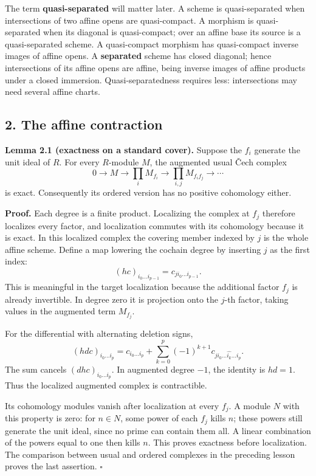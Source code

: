 \documentclass[11pt]{article}
\begin{document}
The term \textbf{quasi-separated} will matter later. A scheme is
quasi-separated when intersections of two affine opens are
quasi-compact. A morphism is quasi-separated when its diagonal is
quasi-compact; over an affine base its source is a quasi-separated
scheme. A quasi-compact morphism has quasi-compact inverse images of
affine opens. A \textbf{separated} scheme has closed diagonal; hence
intersections of its affine opens are affine, being inverse images of
affine products under a closed immersion. Quasi-separatedness requires
less: intersections may need several affine charts.

\subsection{2. The affine contraction}\label{the-affine-contraction}

\textbf{Lemma 2.1 (exactness on a standard cover).} Suppose the \(f_i\)
generate the unit ideal of \(R\). For every \(R\)-module \(M\), the
augmented usual Čech complex \[
0\longrightarrow M\longrightarrow
\prod_i M_{f_i}\longrightarrow
\prod_{i,j}M_{f_if_j}\longrightarrow\cdots
\] is exact. Consequently its ordered version has no positive cohomology
either.

\textbf{Proof.} Each degree is a finite product. Localizing the complex
at \(f_j\) therefore localizes every factor, and localization commutes
with its cohomology because it is exact. In this localized complex the
covering member indexed by \(j\) is the whole affine scheme. Define a
map lowering the cochain degree by inserting \(j\) as the first index:
\[
(hc)_{i_0\ldots i_{p-1}}=c_{j i_0\ldots i_{p-1}}.
\] This is meaningful in the target localization because the additional
factor \(f_j\) is already invertible. In degree zero it is projection
onto the \(j\)-th factor, taking values in the augmented term
\(M_{f_j}\).

For the differential with alternating deletion signs, \[
(hdc)_{i_0\ldots i_p}
=c_{i_0\ldots i_p}
 +\sum_{k=0}^p(-1)^{k+1}c_{j i_0\ldots\widehat{i_k}\ldots i_p}.
\] The sum cancels \((dhc)_{i_0\ldots i_p}\). In augmented degree
\(-1\), the identity is \(hd=1\). Thus the localized augmented complex
is contractible.

Its cohomology modules vanish after localization at every \(f_j\). A
module \(N\) with this property is zero: for \(n\in N\), some power of
each \(f_j\) kills \(n\); these powers still generate the unit ideal,
since no prime can contain them all. A linear combination of the powers
equal to one then kills \(n\). This proves exactness before
localization. The comparison between usual and ordered complexes in the
preceding lesson proves the last assertion. \(\square\)
\end{document}
